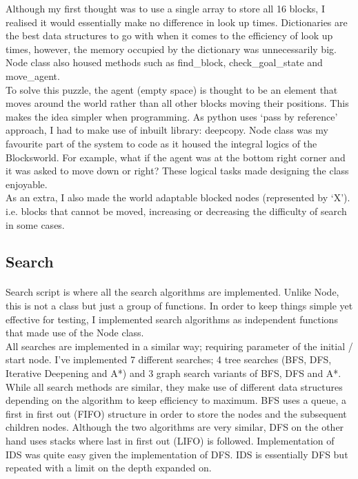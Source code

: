 \documentclass[10pt]{article}
\begin{document}
  Although my first thought was to use a single array to store all 16 blocks, I realised it would essentially make no difference in look up times. Dictionaries are the best data structures to go with when it comes to the efficiency of look up times, however, the memory occupied by the dictionary was unnecessarily big. Node class also housed methods such as find\_block, check\_goal\_state and move\_agent.\\

  To solve this puzzle, the agent (empty space) is thought to be an element that moves around the world rather than all other blocks moving their positions. This makes the idea simpler when programming. As python uses `pass by reference' approach, I had to make use of inbuilt library: deepcopy. Node class was my favourite part of the system to code as it housed the integral logics of the Blocksworld. For example, what if the agent was at the bottom right corner and it was asked to move down or right? These logical tasks made designing the class enjoyable.\\

  As an extra, I also made the world adaptable blocked nodes (represented by `X'). i.e. blocks that cannot be moved, increasing or decreasing the difficulty of search in some cases. 


  \subsection{Search}
  \paragraph{} \indent
  Search script is where all the search algorithms are implemented. Unlike Node, this is not a class but just a group of functions. In order to keep things simple yet effective for testing, I implemented search algorithms as independent functions that made use of the Node class. \\
  
  All searches are implemented in a similar way; requiring parameter of the initial / start node. I’ve implemented 7 different searches; 4 tree searches (BFS, DFS, Iterative Deepening and A*) and 3 graph search variants of BFS, DFS and A*. \\

  While all search methods are similar, they make use of different data structures depending on the algorithm to keep efficiency to maximum. BFS uses a queue, a first in first out (FIFO) structure in order to store the nodes and the subsequent children nodes. Although the two algorithms are very similar, DFS on the other hand uses stacks where last in first out (LIFO) is followed. Implementation of IDS was quite easy given the implementation of DFS. IDS is essentially DFS but repeated with a limit on the depth expanded on. \\
\end{document}
